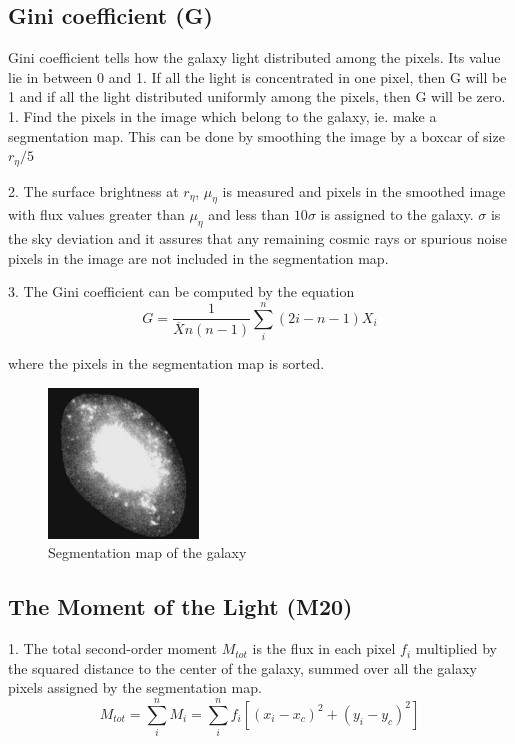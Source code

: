 \documentclass[a4paper,12pt]{article}
\begin{document}
\subsection{Gini coefficient (G)}
Gini coefficient tells how the galaxy light distributed among the pixels. Its value lie in between 0 and 1. If all the light is concentrated in one pixel, then G will be 1 and if all the light distributed uniformly among the pixels, then G will be zero.
1. Find the pixels in the image which belong to the galaxy, ie. make a segmentation map. This can be done by smoothing the image by a boxcar of size   $r_{\eta}/5$

2. The surface brightness at $r_{\eta}$, $\mu_{\eta}$ is measured and pixels in the smoothed image with flux values greater than $\mu_{\eta}$ and less than $10 \sigma$ is assigned to the galaxy. $\sigma$ is the sky deviation and it assures that any remaining cosmic rays or spurious noise pixels in the image are not  included in the segmentation map.

3. The Gini coefficient can be computed by the equation
\begin{equation}
G = \frac{1}{\overline{X} n (n-1)}\sum_{i}^n(2i-n-1)X_i
\end{equation}

 where the pixels in the segmentation map is sorted.

\begin{figure}[h]
        \centering
        \includegraphics[width=4cm,height=4cm,bb=0 0 454 454]{segmentation.jpg}
        \caption{Segmentation map of the galaxy}
        \label{fig:9}
\end{figure}

\subsection{The Moment of the Light (M20)}
1. The total second-order moment $M_{tot}$ is the flux in each pixel $f_i$ multiplied by the squared distance to the center of the galaxy, summed over all the galaxy pixels assigned by the segmentation map.
\begin{equation}
M_{tot}=\sum_{i}^n M_i=\sum_{i}^n f_i\left[ (x_i-x_c)^2 +(y_i-y_c)^2\right]
\end{equation}
\end{document}
